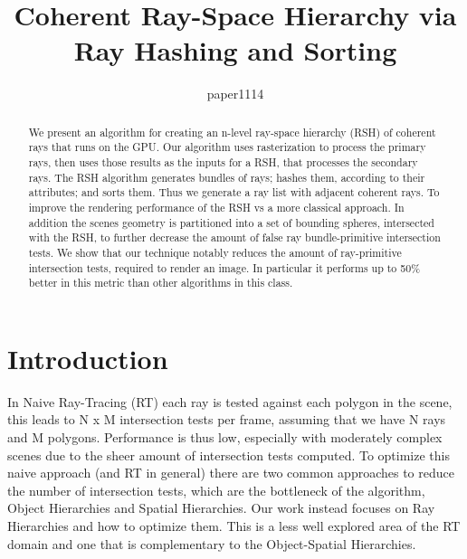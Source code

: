 \documentclass{egpubl}
\title[Coherent Ray-Space Hierarchy via Ray Hashing and Sorting]
      {Coherent Ray-Space Hierarchy via Ray Hashing and Sorting}
\author[paper1114]{paper1114}
\begin{document}

\maketitle

\begin{abstract}

We present an algorithm for creating an n-level ray-space hierarchy (RSH) of coherent rays that runs on the GPU. Our algorithm uses rasterization to process the primary rays, then uses those results as the inputs for a RSH, that processes the secondary rays. The RSH algorithm generates bundles of rays; hashes them, according to their attributes; and sorts them. Thus we generate a ray list with adjacent coherent rays. To improve the rendering performance of the RSH vs a more classical approach. In addition the scenes geometry is partitioned into a set of bounding spheres, intersected with the RSH, to further decrease the amount of false ray bundle-primitive intersection tests. We show that our technique notably reduces the amount of ray-primitive intersection tests, required to render an image. In particular it performs up to 50\% better in this metric than other algorithms in this class.


\begin{classification} %
\end{classification}

\end{abstract}

\section{Introduction}

In Naive Ray-Tracing (RT) each ray is tested against each polygon in the scene, this leads to N x M intersection tests per frame, assuming that we have N rays and M polygons. Performance is thus low, especially with moderately complex scenes due to the sheer amount of intersection tests computed. To optimize this naive approach (and RT in general) there are two common approaches to reduce the number of intersection tests, which are the bottleneck of the algorithm, Object Hierarchies and Spatial Hierarchies. Our work instead focuses on Ray Hierarchies and how to optimize them. This is a less well explored area of the RT domain and one that is complementary to the Object-Spatial Hierarchies.
\end{document}
